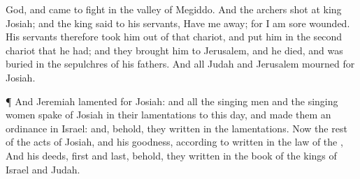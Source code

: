 {God, and
came to
fight in the
valley of
Megiddo.
And the
archers
shot at
king
Josiah; and the
king
said to his
servants, Have me
away; for I am
sore
wounded.
His
servants therefore
took him out of that
chariot, and
put him in the
second
chariot that he had; and they
brought him to
Jerusalem, and he
died, and was
buried in
{} the
sepulchres of his
fathers. And all
Judah and
Jerusalem
mourned for
Josiah.
\par }{\PP {}¶ And
Jeremiah
lamented for
Josiah: and all the singing
men and the singing
women
spake of
Josiah in their
lamentations to this
day, and
made them an
ordinance in
Israel: and, behold, they
{}
written in the
lamentations.
Now the
rest of the
acts of
Josiah, and his
goodness, according to
{}
written in the
law of the
{},
And his
deeds,
first and
last, behold, they
{}
written in the
book of the
kings of
Israel and
Judah.

}
